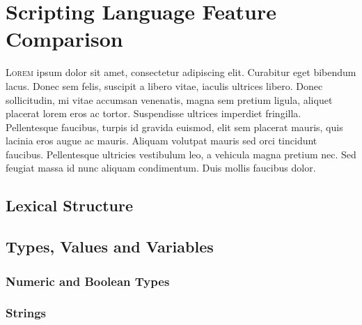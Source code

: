 \section{Scripting Language Feature Comparison}
\label{comparison}



\lettrine[nindent=0em,lines=3]{L}{orem} ipsum dolor sit amet, consectetur adipiscing elit. Curabitur eget bibendum lacus. Donec sem felis, suscipit a libero vitae, iaculis ultrices libero. Donec sollicitudin, mi vitae accumsan venenatis, magna sem pretium ligula, aliquet placerat lorem eros ac tortor. Suspendisse ultrices imperdiet fringilla. Pellentesque faucibus, turpis id gravida euismod, elit sem placerat mauris, quis lacinia eros augue ac mauris. Aliquam volutpat mauris sed orci tincidunt faucibus. Pellentesque ultricies vestibulum leo, a vehicula magna pretium nec. Sed feugiat massa id nunc aliquam condimentum. Duis mollis faucibus dolor.

\subsection{Lexical Structure}

\subsection{Types, Values and Variables}
\subsubsection{Numeric and Boolean Types}

\subsubsection{Strings}

